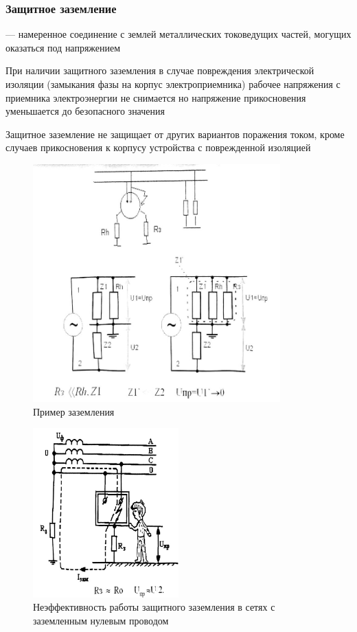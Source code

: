\documentclass[a4paper, 14pt]{extarticle}
\begin{document}
\subsubsection{Защитное заземление}
 --- намеренное соединение с землей металлических токоведущих частей, могущих оказаться под напряжением

При наличии защитного заземления в случае повреждения электрической изоляции (замыкания фазы на корпус электроприемника) рабочее напряжения с приемника электроэнергии не снимается но напряжение прикосновения уменьшается до безопасного значения

Защитное заземление не защищает от других вариантов поражения током, кроме случаев прикосновения к корпусу устройства с поврежденной изоляцией

\begin{figure}[h]
    \centering
    \includegraphics[width=0.85\textwidth]{./img/L4/S001.jpg}
    \caption{Пример заземления}%
    \label{img:4:1}
\end{figure}

\begin{figure}[h]
    \centering
    \includegraphics[width=0.5\textwidth]{./img/L4/S002.jpg}
    \caption{Неэффективность работы защитного заземления в сетях с заземленным нулевым проводом}%
    \label{img:4:2}
\end{figure}
\end{document}
